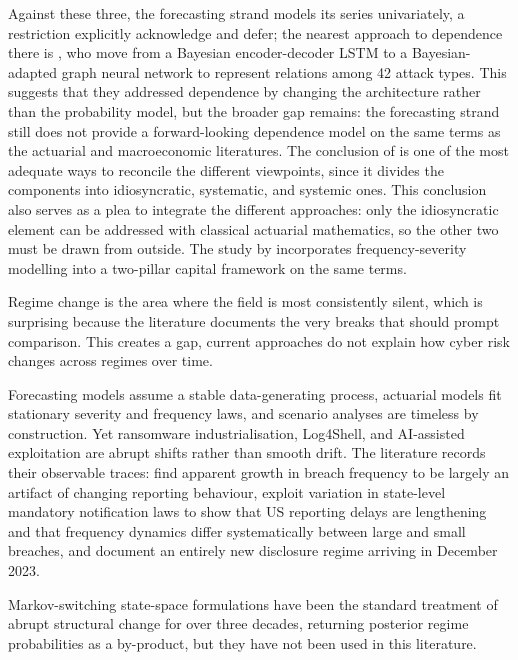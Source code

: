\documentclass[review]{elsarticle}
\begin{document}
Against these three, the forecasting strand models its series univariately, a restriction \citet{kia2024} explicitly acknowledge and defer; the nearest approach to dependence there is \citet{almahmoud2023,almahmoud2025}, who move from a Bayesian encoder-decoder LSTM to a Bayesian-adapted graph neural network to represent relations among 42 attack types. This suggests that they addressed dependence by changing the architecture rather than the probability model, but the broader gap remains: the forecasting strand still does not provide a forward-looking dependence model on the same terms as the actuarial and macroeconomic literatures.
The conclusion of \citet{awiszus2023} is one of the most adequate ways to reconcile the different viewpoints, since it divides the components into idiosyncratic, systematic, and systemic ones. This conclusion also serves as a plea to integrate the different approaches: only the idiosyncratic element can be addressed with classical actuarial mathematics, so the other two must be drawn from outside. The study by \citet{chong2025} incorporates frequency-severity modelling into a two-pillar capital framework on the same terms.

Regime change is the area where the field is most consistently silent, which is surprising because the literature documents the very breaks that should prompt comparison. This creates a gap, current approaches do not explain how cyber risk changes across regimes over time.

Forecasting models assume a stable data-generating process, actuarial models fit stationary severity and frequency laws, and scenario analyses are timeless by construction. Yet ransomware industrialisation, Log4Shell, and AI-assisted exploitation are abrupt shifts rather than smooth drift. The literature records their observable traces: \citet{edwards2016} find apparent growth in breach frequency to be largely an artifact of changing reporting behaviour, \citet{avanzi2025} exploit variation in state-level mandatory notification laws to show that US reporting delays are lengthening and that frequency dynamics differ systematically between large and small breaches, and \citet{block2025} document an entirely new disclosure regime arriving in December 2023.

 Markov-switching state-space formulations \citep{hamilton1989} have been the standard treatment of abrupt structural change for over three decades, returning posterior regime probabilities as a by-product,  but they have not been used in this literature.
\end{document}
